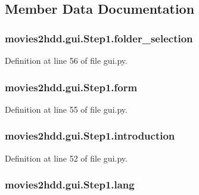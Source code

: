 \subsection{Member Data Documentation}
\hypertarget{classmovies2hdd_1_1gui_1_1_step1_a88c314f92883ddbe7c73ef89f7925929}{
\subsubsection[{folder\-\_\-selection}]{\setlength{\rightskip}{0pt plus 5cm}movies2hdd.\-gui.\-Step1.\-folder\-\_\-selection}}\label{classmovies2hdd_1_1gui_1_1_step1_a88c314f92883ddbe7c73ef89f7925929}


Definition at line 56 of file gui.\-py.

\hypertarget{classmovies2hdd_1_1gui_1_1_step1_adef1bafe9ac90f458d6ef9597b3248b9}{
\subsubsection[{form}]{\setlength{\rightskip}{0pt plus 5cm}movies2hdd.\-gui.\-Step1.\-form}}\label{classmovies2hdd_1_1gui_1_1_step1_adef1bafe9ac90f458d6ef9597b3248b9}


Definition at line 55 of file gui.\-py.

\hypertarget{classmovies2hdd_1_1gui_1_1_step1_a682a18695266e8fecbd3df9151f76e4a}{
\subsubsection[{introduction}]{\setlength{\rightskip}{0pt plus 5cm}movies2hdd.\-gui.\-Step1.\-introduction}}\label{classmovies2hdd_1_1gui_1_1_step1_a682a18695266e8fecbd3df9151f76e4a}


Definition at line 52 of file gui.\-py.

\hypertarget{classmovies2hdd_1_1gui_1_1_step1_abd8a0c304da63971d4941db343634d11}{
\subsubsection[{lang}]{\setlength{\rightskip}{0pt plus 5cm}movies2hdd.\-gui.\-Step1.\-lang}}\label{classmovies2hdd_1_1gui_1_1_step1_abd8a0c304da63971d4941db343634d11}


